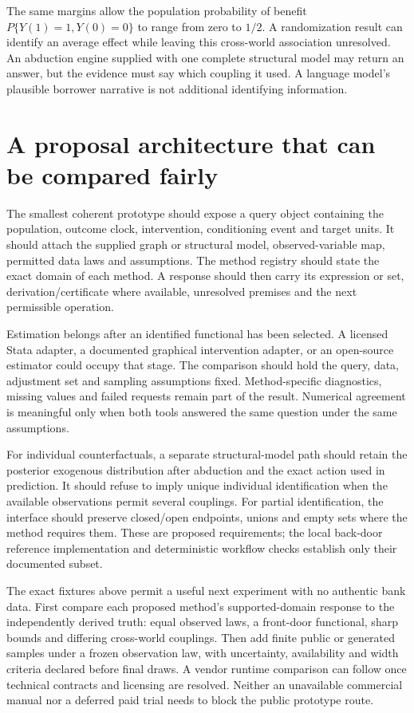 The same margins allow the population probability of benefit
$P\{Y(1)=1,Y(0)=0\}$ to range from zero to $1/2$. A randomization result
can identify an average effect while leaving this cross-world association
unresolved. An abduction engine supplied with one complete structural model
may return an answer, but the evidence must say which coupling it used. A
language model's plausible borrower narrative is not additional identifying
information.

\section{A proposal architecture that can be compared fairly}

The smallest coherent prototype should expose a query object containing the
population, outcome clock, intervention, conditioning event and target units.
It should attach the supplied graph or structural model, observed-variable
map, permitted data laws and assumptions. The method registry should state
the exact domain of each method. A response should then carry its expression
or set, derivation/certificate where available, unresolved premises and the
next permissible operation.

Estimation belongs after an identified functional has been selected. A
licensed Stata adapter, a documented graphical intervention adapter, or an
open-source estimator could occupy that stage. The comparison should hold the
query, data, adjustment set and sampling assumptions fixed. Method-specific
diagnostics, missing values and failed requests remain part of the result.
Numerical agreement is meaningful only when both tools answered the same
question under the same assumptions.

For individual counterfactuals, a separate structural-model path should retain
the posterior exogenous distribution after abduction and the exact action used
in prediction. It should refuse to imply unique individual identification when
the available observations permit several couplings. For partial identification,
the interface should preserve closed/open endpoints, unions and empty sets
where the method requires them. These are proposed requirements; the local
back-door reference implementation and deterministic workflow checks establish
only their documented subset.

The exact fixtures above permit a useful next experiment with no authentic
bank data. First compare each proposed method's supported-domain response to
the independently derived truth: equal observed laws, a front-door functional,
sharp bounds and differing cross-world couplings. Then add finite public or
generated samples under a frozen observation law, with uncertainty, availability
and width criteria declared before final draws. A vendor runtime comparison
can follow once technical contracts and licensing are resolved. Neither an
unavailable commercial manual nor a deferred paid trial needs to block the
public prototype route.

